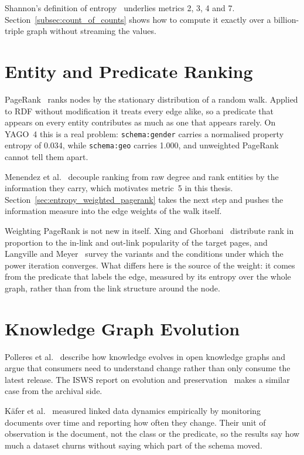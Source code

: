 Shannon's definition of entropy~\cite{shannon1948mathematical} underlies metrics
2, 3, 4 and 7. Section~\ref{subsec:count_of_counts} shows how to compute it exactly
over a billion-triple graph without streaming the values.

\section{Entity and Predicate Ranking}
\label{sec:rw_ranking}

PageRank~\cite{page1999pagerank} ranks nodes by the stationary distribution of a
random walk. Applied to RDF without modification it treats every edge alike, so
a predicate that appears on every entity contributes as much as one that appears
rarely. On YAGO~4 this is a real problem: \texttt{schema:gender} carries a
normalised property entropy of 0.034, while \texttt{schema:geo} carries 1.000,
and unweighted PageRank cannot tell them apart.

Menendez et al.~\cite{menendez2018ranking} decouple ranking from raw
degree and rank entities by the information they carry, which motivates metric~5
in this thesis. Section~\ref{sec:entropy_weighted_pagerank} takes the next step
and pushes the information measure into the edge weights of the walk itself.

Weighting PageRank is not new in itself. Xing and Ghorbani~\cite{xing2004weighted}
distribute rank in proportion to the in-link and out-link popularity of the
target pages, and Langville and Meyer~\cite{langville2004deeper} survey the
variants and the conditions under which the power iteration converges. What
differs here is the source of the weight: it comes from the predicate that
labels the edge, measured by its entropy over the whole graph, rather than from
the link structure around the node.

\section{Knowledge Graph Evolution}
\label{sec:rw_evolution}

Polleres et al.~\cite{polleres2023knowledge} describe how knowledge evolves in
open knowledge graphs and argue that consumers need to understand change rather
than only consume the latest release. The ISWS report on evolution and
preservation~\cite{isws2019evolution} makes a similar case from the archival
side.

Käfer et al.~\cite{kafer2013observing} measured linked data dynamics empirically
by monitoring documents over time and reporting how often they change. Their unit
of observation is the document, not the class or the predicate, so the results
say how much a dataset churns without saying which part of the schema moved.


